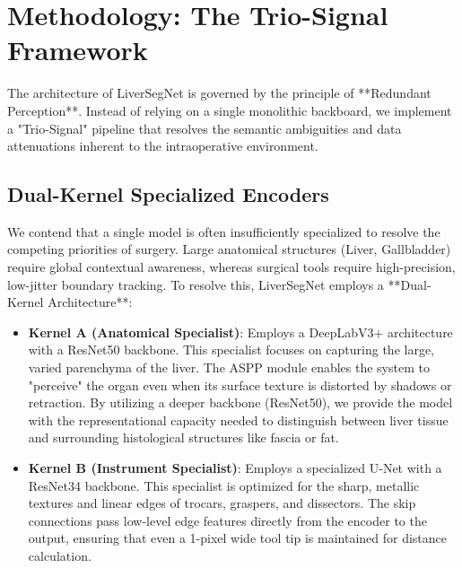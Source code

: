\documentclass[conference]{IEEEtran}
\begin{document}
\section{Methodology: The Trio-Signal Framework}

The architecture of LiverSegNet is governed by the principle of **Redundant Perception**. Instead of relying on a single monolithic backboard, we implement a "Trio-Signal" pipeline that resolves the semantic ambiguities and data attenuations inherent to the intraoperative environment. 

\subsection{Dual-Kernel Specialized Encoders}
We contend that a single model is often insufficiently specialized to resolve the competing priorities of surgery. Large anatomical structures (Liver, Gallbladder) require global contextual awareness, whereas surgical tools require high-precision, low-jitter boundary tracking. To resolve this, LiverSegNet employs a **Dual-Kernel Architecture**:
\begin{itemize}
    \item \textbf{Kernel A (Anatomical Specialist)}: Employs a DeepLabV3+ architecture with a ResNet50 backbone. This specialist focuses on capturing the large, varied parenchyma of the liver. The ASPP module enables the system to "perceive" the organ even when its surface texture is distorted by shadows or retraction. By utilizing a deeper backbone (ResNet50), we provide the model with the representational capacity needed to distinguish between liver tissue and surrounding histological structures like fascia or fat.
    \item \textbf{Kernel B (Instrument Specialist)}: Employs a specialized U-Net with a ResNet34 backbone. This specialist is optimized for the sharp, metallic textures and linear edges of trocars, graspers, and dissectors. The skip connections pass low-level edge features directly from the encoder to the output, ensuring that even a 1-pixel wide tool tip is maintained for distance calculation. 
\end{itemize}
\end{document}

